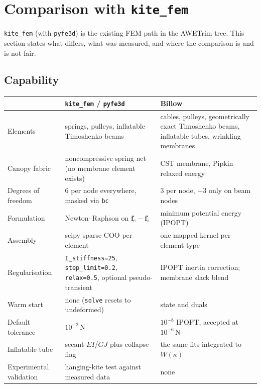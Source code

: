\documentclass[11pt,a4paper]{article}
\newcommand{\code}[1]{\texttt{\small #1}}
\begin{document}
\section{Comparison with \texorpdfstring{\code{kite\_fem}}{kite\_fem}}

\code{kite\_fem} (with \code{pyfe3d}) is the existing FEM path in the AWETrim
tree. This section states what differs, what was measured, and where the
comparison is and is not fair.

\subsection{Capability}

\begin{table}[H]
\centering
\small
\begin{tabular}{p{4.0cm}p{5.1cm}p{5.1cm}}
\toprule
& \code{kite\_fem} / \code{pyfe3d} & \textbf{Billow}\\
\midrule
Elements & springs, pulleys, inflatable Timoshenko beams
         & cables, pulleys, geometrically exact Timoshenko beams,
           inflatable tubes, wrinkling membranes\\
Canopy fabric & noncompressive spring net (no membrane element exists)
              & CST membrane, Pipkin relaxed energy\\
Degrees of freedom & 6 per node everywhere, masked via \code{bc}
                   & 3 per node, $+3$ only on beam nodes\\
Formulation & Newton--Raphson on $\mathbf{f}_e-\mathbf{f}_i$
            & minimum potential energy (IPOPT)\\
Assembly & scipy sparse COO per element & one mapped kernel per element type\\
Regularisation & \code{I\_stiffness=25}, \code{step\_limit=0.2},
                 \code{relax=0.5}, optional pseudo-transient
               & IPOPT inertia correction; membrane slack blend\\
Warm start & none (\code{solve} resets to undeformed) & state and duals\\
Default tolerance & $10^{-2}$\,N & $10^{-8}$ IPOPT, accepted at $10^{-6}$\,N\\
Inflatable tube & secant $EI$/$GJ$ plus collapse flag
                & the same fits integrated to $W(\kappa)$\\
Experimental validation & hanging-kite test against measured data & none\\
\bottomrule
\end{tabular}
\end{table}
\end{document}

